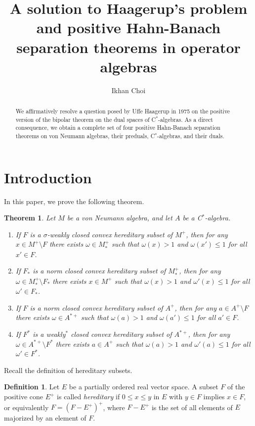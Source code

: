 \documentclass[noamsfonts,a4paper,10pt]{amsart}
\title[Positive Hahn-Banach separation theorems]{A solution to Haagerup's problem and positive Hahn-Banach separation theorems in operator algebras}
\author[I. Choi]{Ikhan Choi}
\theoremstyle{plain}
\newtheorem*{thm*}{Theorem}
\theoremstyle{definition}
\newtheorem{defn}[thm]{Definition}
\theoremstyle{remark}
\begin{document}
\begin{abstract}
We affirmatively resolve a question posed by Uffe Haagerup in 1975 on the positive version of the bipolar theorem on the dual spaces of C$^*$-algebras.
As a direct consequence, we obtain a complete set of four positive Hahn-Banach separation theorems on von Neumann algebras, their preduals, C$^*$-algebras, and their duals.
\end{abstract}

\maketitle

\section{Introduction}

In this paper, we prove the following theorem.

\begin{thm*}
Let $M$ be a von Neumann algebra, and let $A$ be a C$^*$-algebra.
\begin{enumerate}
\item If $F$ is a $\sigma$-weakly closed convex hereditary subset of $M^+$, then for any $x\in M^+\setminus F$ there exists $\omega\in M_*^+$ such that $\omega(x)>1$ and $\omega(x')\le1$ for all $x'\in F$.
\item If $F_*$ is a norm closed convex hereditary subset of $M_*^+$, then for any $\omega\in M_*^+\setminus F_*$ there exists $x\in M^+$ such that $\omega(x)>1$ and $\omega'(x)\le1$ for all $\omega'\in F_*$.
\item If $F$ is a norm closed convex hereditary subset of $A^+$, then for any $a\in A^+\setminus F$\quad there exists $\omega\in A^{*+}$ such that $\omega(a)>1$ and $\omega(a')\le1$ for all $a'\in F$.
\item If $F^*$ is a weakly$^*$ closed convex hereditary subset of $A^{*+}$, then for any $\omega\in A^{*+}\setminus F^*$ there exists $a\in A^+$ such that $\omega(a)>1$ and $\omega'(a)\le1$ for all $\omega'\in F^*$.
\end{enumerate}
\end{thm*}

Recall the definition of hereditary subsets.

\begin{defn}
Let $E$ be a partially ordered real vector space.
A subset $F$ of the positive cone $E^+$ is called \emph{hereditary} if $0\le x\le y$ in $E$ with $y\in F$ implies $x\in F$, or equivalently $F=(F-E^+)^+$, where $F-E^+$ is the set of all elements of $E$ majorized by an element of $F$.
\end{defn}
\end{document}
